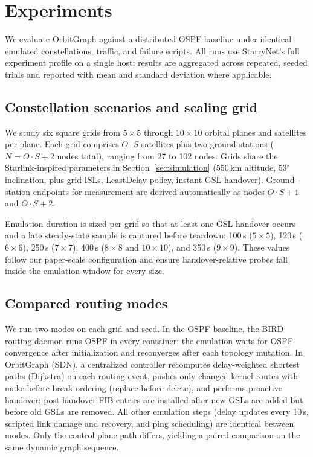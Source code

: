 
\section{Experiments}
\label{sec:experiments}

We evaluate OrbitGraph against a distributed OSPF baseline under identical
emulated constellations, traffic, and failure scripts.
All runs use StarryNet's full experiment profile on a single host; results are
aggregated across repeated, seeded trials and reported with mean and standard
deviation where applicable.

\subsection{Constellation scenarios and scaling grid}

We study six square grids from $5{\times}5$ through $10{\times}10$ orbital
planes and satellites per plane.
Each grid comprises $O \cdot S$ satellites plus two ground stations ($N = O
\cdot S + 2$ nodes total), ranging from 27 to 102 nodes.
Grids share the Starlink-inspired parameters in Section~\ref{sec:simulation}
(550\,km altitude, 53$^\circ$ inclination, plus-grid ISLs, LeastDelay policy,
instant GSL handover).
Ground-station endpoints for measurement are derived automatically as nodes
$O \cdot S + 1$ and $O \cdot S + 2$.

Emulation duration is sized per grid so that at least one GSL handover occurs
and a late steady-state sample is captured before teardown:
100\,s ($5{\times}5$), 120\,s ($6{\times}6$), 250\,s ($7{\times}7$),
400\,s ($8{\times}8$ and $10{\times}10$), and 350\,s ($9{\times}9$).
These values follow our paper-scale configuration and ensure handover-relative
probes fall inside the emulation window for every size.

\subsection{Compared routing modes}

We run two modes on each grid and seed.
In the OSPF baseline, the BIRD routing daemon runs OSPF in every container;
the emulation waits for OSPF convergence after initialization and reconverges
after each topology mutation.
In OrbitGraph (SDN), a centralized controller recomputes delay-weighted
shortest paths (Dijkstra) on each routing event, pushes only changed kernel
routes with make-before-break ordering (replace before delete), and performs
proactive handover: post-handover FIB entries are installed after new GSLs are
added but before old GSLs are removed.
All other emulation steps (delay updates every 10\,s, scripted link damage and
recovery, and ping scheduling) are identical between modes.
Only the control-plane path differs, yielding a paired comparison on the same
dynamic graph sequence.

